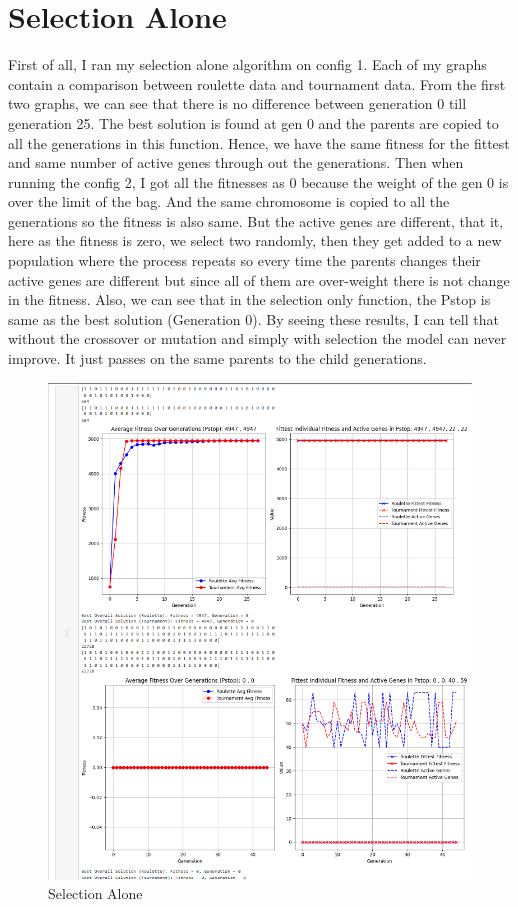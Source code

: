 \documentclass{article}
\begin{document}
\section*{Selection Alone}
	First of all, I ran my selection alone algorithm on config 1. Each of my graphs contain a comparison between roulette data and tournament data. From the first two graphs, we can see that there is no difference between generation 0 till generation 25. The best solution is found at gen 0 and the parents are copied to all the generations in this function. Hence, we have the same fitness for the fittest and same number of active genes through out the generations. Then when running the config 2, I got all the fitnesses as 0 because the weight of the gen 0 is over the limit of the bag. And the same chromosome is copied to all the generations so the fitness is also same. But the active genes are different, that it, here as the fitness is zero, we select two randomly, then they get added to a new population where the process repeats so every time the parents changes their active genes are different but since all of them are over-weight there is not change in the fitness. Also, we can see that in the selection only function, the Pstop is same as the best solution (Generation 0). By seeing these results, I can tell that without the crossover or mutation and simply with selection the model can never improve. It just passes on the same parents to the child generations.
 \begin{figure}[h]
    \centering
    \includegraphics[width=0.5\linewidth]{q1.png}
    \caption{Selection Alone}
    \label{fig:enter-label}
\end{figure}
\end{document}
